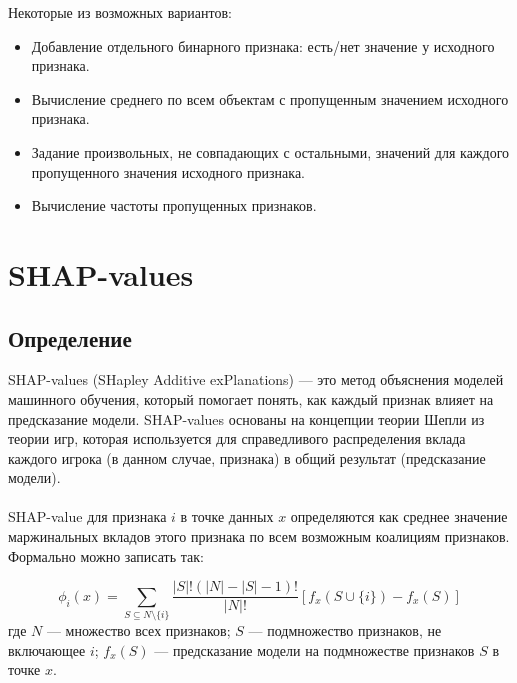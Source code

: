 Некоторые из возможных вариантов:
\begin{itemize}
	\item Добавление отдельного бинарного признака: есть/нет значение у исходного признака.
	\item Вычисление среднего по всем объектам с пропущенным значением исходного признака.
	\item Задание произвольных, не совпадающих с остальными, значений для каждого пропущенного значения исходного признака.
	\item Вычисление частоты пропущенных признаков.
\end{itemize}

\section*{SHAP-values}

\subsection*{Определение}
SHAP-values (SHapley Additive exPlanations) — это метод объяснения моделей машинного обучения, который помогает понять, как каждый признак влияет на предсказание модели. SHAP-values основаны на концепции теории Шепли из теории игр, которая используется для справедливого распределения вклада каждого игрока (в данном случае, признака) в общий результат (предсказание модели).\\\\
SHAP-value для признака $i$ в точке данных $x$ определяются как среднее значение маржинальных вкладов этого признака по всем возможным коалициям признаков. Формально можно записать так:

\[ \phi_i(x) = \sum_{S \subseteq N \setminus \{i\}} \frac{|S|!(|N|-|S|-1)!}{|N|!} [f_x(S \cup \{i\}) - f_x(S)] \]
где $N$ — множество всех признаков; $S$ — подмножество признаков, не включающее $i$; $f_x(S)$ — предсказание модели на подмножестве признаков $S$ в точке $x$.

